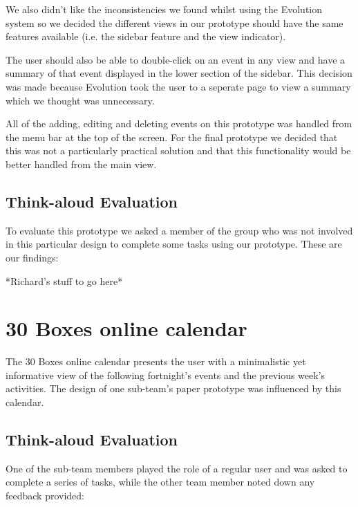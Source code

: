 \documentclass{article}
\begin{document}
We also didn't like the inconsistencies we found whilst using the
Evolution system so we decided the different views in our prototype
should have the same features available (i.e. the sidebar feature and
the view indicator).

The user should also be able to double-click on an event in any view and
have a summary of that event displayed in the lower section of the
sidebar. This decision was made because Evolution took the user to a
seperate page to view a summary which we thought was unnecessary.

All of the adding, editing and deleting events on this prototype was 
handled from the menu bar at the top of the screen. For the final
prototype we decided that this was not a particularly practical solution
and that this functionality would be better handled from the main view.

\subsection{Think-aloud Evaluation}
To evaluate this prototype we asked a member of the group who was not
involved in this particular design to complete some tasks using our
prototype. These are our findings:

*Richard's stuff to go here*

\section{30 Boxes online calendar}

The 30 Boxes online calendar presents the user with a minimalistic yet 
informative view of the following fortnight's events and the previous 
week's activities. The design of one sub-team's paper prototype was influenced 
by this calendar. 

\subsection{Think-aloud Evaluation}

One of the sub-team members played the role of a regular user and was asked to 
complete a series of tasks, while the other team member noted down any
feedback provided:
\end{document}
